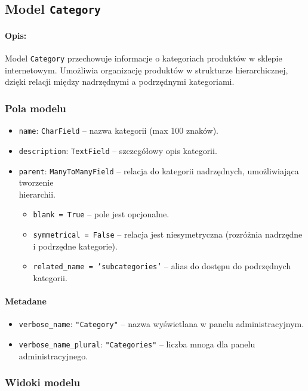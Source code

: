 \documentclass[12pt,a4paper,oneside]{article}
\theoremstyle{definition}
\numberwithin{equation}{section}
\begin{document}
%
\clearpage
\subsection{Model \texttt{Category}}
\paragraph{Opis:}
Model \texttt{Category} przechowuje informacje o kategoriach produktów w sklepie internetowym. Umożliwia organizację produktów w strukturze hierarchicznej, dzięki relacji między nadrzędnymi a podrzędnymi kategoriami.

\subsubsection{Pola modelu}
\begin{itemize}
    \item \texttt{name}: \texttt{CharField} – nazwa kategorii (max 100 znaków).
    \item \texttt{description}: \texttt{TextField} – szczegółowy opis kategorii.
    \item \texttt{parent}: \texttt{ManyToManyField} – relacja do kategorii nadrzędnych, umożliwiająca tworzenie\\ hierarchii.
    \begin{itemize}
        \item \texttt{blank = True} – pole jest opcjonalne.
        \item \texttt{symmetrical = False} – relacja jest niesymetryczna (rozróżnia nadrzędne i podrzędne kategorie).
        \item \texttt{related\_name = 'subcategories'} – alias do dostępu do podrzędnych kategorii.
    \end{itemize}
\end{itemize}

\paragraph{Metadane}
\begin{itemize}
    \item \texttt{verbose\_name}: \texttt{"Category"} – nazwa wyświetlana w panelu administracyjnym.
    \item \texttt{verbose\_name\_plural}: \texttt{"Categories"} – liczba mnoga dla panelu administracyjnego.
\end{itemize}


\subsubsection{Widoki modelu}
\end{document}
